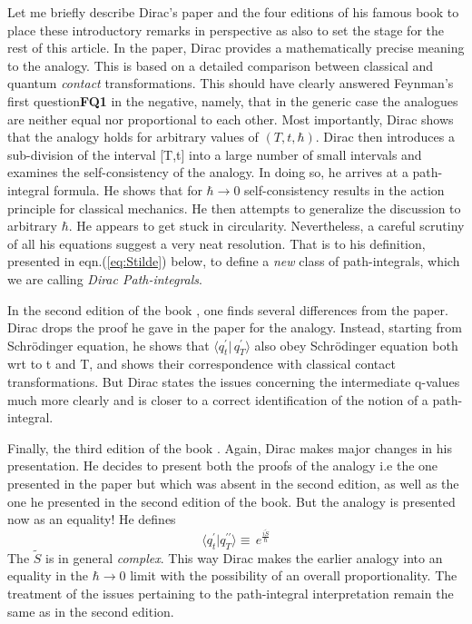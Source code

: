 \documentclass[12pt]{article}
\newcommand{\be}{\begin{equation}}
\newcommand{\ee}{\end{equation}}
\begin{document}
Let me briefly describe Dirac's paper \cite{diracpaper} and the four editions of his famous book 
\cite{diracbook1,diracbook2,diracbook3,diracbook4,diracbook4r} to place these introductory remarks in perspective as also
to set the stage for the rest of this article. In the paper, Dirac provides a mathematically precise meaning to the analogy. This is 
based on a detailed comparison between classical and quantum {\it contact} transformations. This should have clearly answered Feynman's first 
question{\bf FQ1} in the negative, namely, that in the generic case the analogues are neither equal nor proportional to each other. 
Most importantly,
Dirac shows that the analogy holds for arbitrary values of $(T,t,\hbar)$. Dirac then introduces a sub-division of the interval [T,t] into a
large number of small intervals and examines the self-consistency of the analogy. In doing so, he arrives at a path-integral formula. He
shows that for $\hbar \rightarrow 0$ self-consistency results in the action principle for classical mechanics. He then attempts to generalize
the discussion to arbitrary $\hbar$. He appears to get 
stuck in circularity. Nevertheless, a careful scrutiny of all his equations suggest a very neat resolution. That is to his definition, 
presented in eqn.(\ref{eq:Stilde}) below, to define a \emph{new} class of path-integrals, which we are calling {\it Dirac Path-integrals}.

In the second edition of the book \cite{diracbook2}, one finds several differences from the paper. Dirac drops the proof he gave in 
the paper for the analogy.
Instead, starting from Schr\"odinger equation, he shows that $\langle q_t^\prime|\,q_T^\prime\rangle$ also obey Schr\"odinger equation
both wrt to t and T, and shows their
correspondence with classical contact transformations. 
But Dirac states the issues concerning the intermediate 
q-values much more clearly and is closer to a correct identification of the notion of a path-integral.

Finally, the third edition of the book \cite{diracbook3}. Again, Dirac makes major changes in his presentation. He decides to present 
both the proofs of the analogy i.e the one presented in the paper but which was absent in the second edition, as well as the one he 
presented in the second edition of the book. But the analogy is presented now as an equality! He defines
\be
\label{eq:Stilde}
\langle q^\prime_t|q^{\prime\prime}_T\rangle 
\equiv\,e^{\frac{i {\tilde S}}{\hbar}}
\ee
The ${\tilde S}$ is in general \emph{complex}.
This way Dirac makes the earlier analogy into an equality in the $\hbar \rightarrow 0$ limit with the possibility of an overall 
proportionality. The treatment of the issues pertaining to the path-integral interpretation remain the same as in the second edition. 
\end{document}
